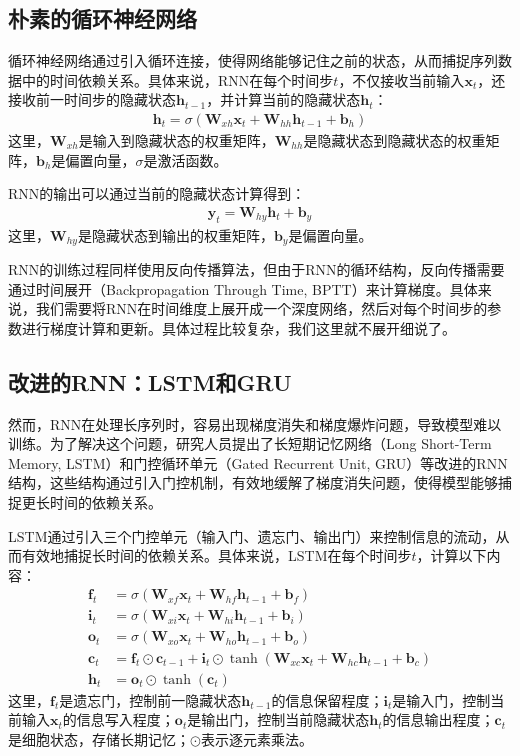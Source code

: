 \subsection{朴素的循环神经网络}

循环神经网络通过引入循环连接，使得网络能够记住之前的状态，从而捕捉序列数据中的时间依赖关系。具体来说，RNN在每个时间步$t$，不仅接收当前输入$\mathbf{x}_t$，还接收前一时间步的隐藏状态$\mathbf{h}_{t-1}$，并计算当前的隐藏状态$\mathbf{h}_t$：
\begin{align*}
\mathbf{h}_t = \sigma(\mathbf{W}_{xh} \mathbf{x}_t + \mathbf{W}_{hh} \mathbf{h}_{t-1} + \mathbf{b}_h)
\end{align*}
这里，$\mathbf{W}_{xh}$是输入到隐藏状态的权重矩阵，$\mathbf{W}_{hh}$是隐藏状态到隐藏状态的权重矩阵，$\mathbf{b}_h$是偏置向量，$\sigma$是激活函数。

RNN的输出可以通过当前的隐藏状态计算得到：
\begin{align*}
\mathbf{y}_t = \mathbf{W}_{hy} \mathbf{h}_t + \mathbf{b}_y
\end{align*}
这里，$\mathbf{W}_{hy}$是隐藏状态到输出的权重矩阵，$\mathbf{b}_y$是偏置向量。

RNN的训练过程同样使用反向传播算法，但由于RNN的循环结构，反向传播需要通过时间展开（Backpropagation Through Time, BPTT）来计算梯度。具体来说，我们需要将RNN在时间维度上展开成一个深度网络，然后对每个时间步的参数进行梯度计算和更新。具体过程比较复杂，我们这里就不展开细说了。

\subsection{改进的RNN：LSTM和GRU}

然而，RNN在处理长序列时，容易出现梯度消失和梯度爆炸问题，导致模型难以训练。为了解决这个问题，研究人员提出了长短期记忆网络（Long Short-Term Memory, LSTM）和门控循环单元（Gated Recurrent Unit, GRU）等改进的RNN结构，这些结构通过引入门控机制，有效地缓解了梯度消失问题，使得模型能够捕捉更长时间的依赖关系。

LSTM通过引入三个门控单元（输入门、遗忘门、输出门）来控制信息的流动，从而有效地捕捉长时间的依赖关系。具体来说，LSTM在每个时间步$t$，计算以下内容：
\begin{align*}
\mathbf{f}_t &= \sigma(\mathbf{W}_{xf} \mathbf{x}_t + \mathbf{W}_{hf} \mathbf{h}_{t-1} + \mathbf{b}_f) \\
\mathbf{i}_t &= \sigma(\mathbf{W}_{xi} \mathbf{x}_t + \mathbf{W}_{hi} \mathbf{h}_{t-1} + \mathbf{b}_i) \\
\mathbf{o}_t &= \sigma(\mathbf{W}_{xo} \mathbf{x}_t + \mathbf{W}_{ho} \mathbf{h}_{t-1} + \mathbf{b}_o) \\
\mathbf{c}_t &= \mathbf{f}_t \odot \mathbf{c}_{t-1} + \mathbf{i}_t \odot \tanh(\mathbf{W}_{xc} \mathbf{x}_t + \mathbf{W}_{hc} \mathbf{h}_{t-1} + \mathbf{b}_c) \\
\mathbf{h}_t &= \mathbf{o}_t \odot \tanh(\mathbf{c}_t)
\end{align*}
这里，$\mathbf{f}_t$是遗忘门，控制前一隐藏状态$\mathbf{h}_{t-1}$的信息保留程度；$\mathbf{i}_t$是输入门，控制当前输入$\mathbf{x}_t$的信息写入程度；$\mathbf{o}_t$是输出门，控制当前隐藏状态$\mathbf{h}_t$的信息输出程度；$\mathbf{c}_t$是细胞状态，存储长期记忆；$\odot$表示逐元素乘法。

